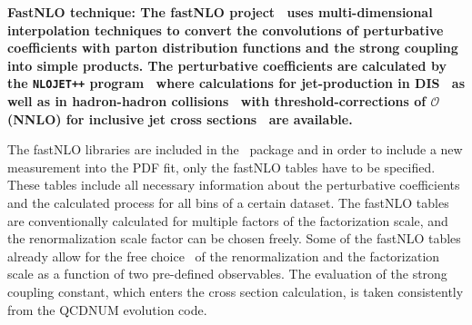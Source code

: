 \begin{description}
\item \bf {FastNLO technique:} \rm
The fastNLO project~\cite{Kluge:2006xs,Wobisch:2011ij,Britzger:2012bs}
uses multi-dimensional interpolation
techniques to convert the convolutions of perturbative 
coefficients with parton distribution functions and 
the strong coupling into simple products.
The perturbative 
coefficients are calculated by the \texttt{NLOJET++}
program~\cite{Nagy:1998bb} where calculations for jet-production
in DIS~\cite{Nagy:2001xb}  as well as in hadron-hadron 
collisions~\cite{Nagy:2003tz,Nagy:2001fj} with threshold-corrections 
of $\mathcal{O}$(NNLO) for inclusive jet cross 
sections~\cite{Kidonakis:2000gi} are available.

The fastNLO libraries are included in the \fitter\ package
and in order to include a new measurement into the PDF fit,
only the fastNLO tables have to be specified. These tables include all
necessary information about the perturbative coefficients and the
calculated process for all bins of a certain dataset. 
%
The fastNLO tables are conventionally calculated
for multiple factors of the factorization scale, 
and the renormalization scale factor can be chosen freely.
Some of the fastNLO tables already allow for 
the free choice~\cite{Britzger:2012bs} of the renormalization and the factorization
scale as a function of two pre-defined observables.
The evaluation of the strong coupling constant, which enters
the cross section calculation, is taken consistently from the 
QCDNUM evolution code.
\end{description}

